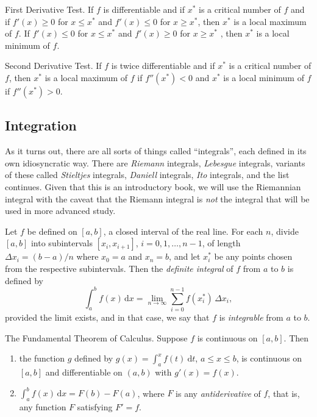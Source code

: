 \documentclass[captions=tableheading]{scrbook}
\begin{document}
\begin{example}
\begin{thm}
First Derivative Test. If \(f\) is differentiable and if \(x^{\ast}\) is a critical number of \(f\) and if \(f'(x)\geq0\) for \(x\leq x^{\ast}\) and \(f'(x)\leq0\) for \(x\geq x^{\ast}\), then \(x^{\ast}\) is a local maximum of \(f\). If \(f'(x)\leq0\) for \(x\leq x^{\ast}\) and \(f'(x)\geq0\) for \(x\geq x^{\ast}\) , then \(x^{\ast}\) is a local minimum of \(f\).
\end{thm}

\begin{thm}
Second Derivative Test. If \(f\) is twice differentiable and if \(x^{\ast}\) is a critical number of \(f\), then \(x^{\ast}\) is a local maximum of \(f\) if \(f''(x^{\ast})<0\) and \(x^{\ast}\) is a local minimum of \(f\) if \(f''(x^{\ast})>0\).
\end{thm}
\subsection{Integration}
\label{sec-21-2-4}

As it turns out, there are all sorts of things called ``integrals'', each defined in its own idiosyncratic way. There are \emph{Riemann} integrals, \emph{Lebesgue} integrals, variants of these called \emph{Stieltjes} integrals, \emph{Daniell} integrals, \emph{Ito} integrals, and the list continues. Given that this is an introductory book, we will use the Riemannian integral with the caveat that the Riemann integral is \emph{not} the integral that will be used in more advanced study.

\begin{defn}
Let \(f\) be defined on \([a,b]\), a closed interval of the real line. For each \(n\), divide \([a,b]\) into subintervals \([x_{i},x_{i+1}]\), \(i=0,1,\ldots,n-1\), of length \(\Delta x_{i}=(b-a)/n\) where \(x_{0}=a\) and \(x_{n}=b\), and let \(x_{i}^{\ast}\) be any points chosen from the respective subintervals. Then the \emph{definite integral} of \(f\) from \(a\) to \(b\) is defined by
\begin{equation}
\int_{a}^{b}f(x)\,\mathrm{d} x=\lim_{n\to\infty}\sum_{i=0}^{n-1}f(x_{i}^{\ast})\,\Delta x_{i},
\end{equation}
provided the limit exists, and in that case, we say that \(f\) is \emph{integrable} from \(a\) to \(b\). 
\end{defn}

\begin{thm}
The Fundamental Theorem of Calculus. Suppose \(f\) is continuous on \([a,b]\). Then
\begin{enumerate}
\item the function \(g\) defined by \(g(x)=\int_{a}^{x}f(t)\:\mathrm{d} t\), \(a\leq x\leq b\), is continuous on \([a,b]\) and differentiable on \((a,b)\) with \(g'(x)=f(x)\).
\item \(\int_{a}^{b}f(x)\,\mathrm{d} x=F(b)-F(a)\), where \(F\) is any \emph{antiderivative} of \(f\), that is, any function \(F\) satisfying \(F'=f\).
\end{enumerate}


\end{thm}
\end{example}
\end{document}

